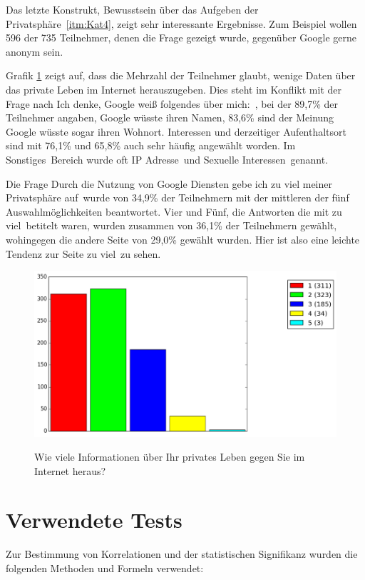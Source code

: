 Das letzte Konstrukt, \glqq Bewusstsein über das Aufgeben der Privatsphäre\grqq\ \ref{itm:Kat4}, zeigt sehr interessante Ergebnisse. Zum Beispiel wollen 596 der 735 Teilnehmer, denen die Frage gezeigt wurde, gegenüber Google gerne anonym sein.

Grafik \ref{giveinfo} zeigt auf, dass die Mehrzahl der Teilnehmer glaubt, wenige Daten über das private Leben im Internet herauszugeben. Dies steht im Konflikt mit der Frage nach \glqq Ich denke, Google weiß folgendes über mich:\grqq\ , bei der 89,7\% der Teilnehmer angaben, Google wüsste ihren Namen, 83,6\% sind der Meinung Google wüsste sogar ihren Wohnort. Interessen und derzeitiger Aufenthaltsort sind mit 76,1\% und 65,8\% auch sehr häufig angewählt worden. Im \glqq Sonstiges\grqq\ Bereich wurde oft \glqq IP Adresse\grqq\ und \glqq Sexuelle Interessen\grqq\ genannt.

Die Frage \glqq Durch die Nutzung von Google Diensten gebe ich zu viel meiner Privatsphäre auf\grqq\ wurde von 34,9\% der Teilnehmern mit der mittleren der fünf Auswahlmöglichkeiten beantwortet. Vier und Fünf, die Antworten die mit \glqq zu viel\grqq\ betitelt waren, wurden zusammen von 36,1\% der Teilnehmern gewählt, wohingegen die andere Seite von 29,0\% gewählt wurden. Hier ist also eine leichte Tendenz zur Seite \glqq zu viel\grqq\ zu sehen.

\begin{figure}[H]
\centering
\includegraphics[scale=0.55]{images/giveinfo}\\
\caption{Wie viele Informationen über Ihr privates Leben gegen Sie im Internet heraus?}\label{giveinfo}
\end{figure}

\section{Verwendete Tests}
\label{sec:tests}
Zur Bestimmung von Korrelationen und der statistischen Signifikanz wurden die folgenden Methoden und Formeln verwendet:

